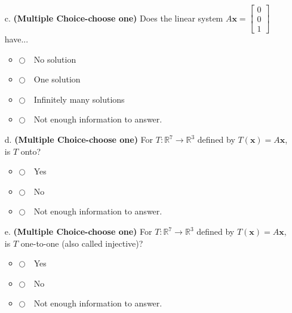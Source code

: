 \documentclass[12pt]{extarticle}
\newcommand{\chooseone}{{\Large$\Circle$\ \ }}
\begin{document}
\begin{enumerate}
\begin{itemize}
    \item[c.] \textbf{(Multiple Choice-choose one)}  Does the linear system $A\mathbf{x}=\begin{bmatrix} 0 \\0 \\1\end{bmatrix}$ have...
\begin{itemize}[label={}]
\item \chooseone No solution
\item \chooseone One solution
\item \chooseone Infinitely many solutions
\item \chooseone Not enough information to answer.
\end{itemize}  
     \vfill


     \item[d.] \textbf{(Multiple Choice-choose one)} For $T:\mathbb{R}^7\to\mathbb{R}^3$ defined by $T(\mathbf{x})=A\mathbf{x}$, is $T$ onto?
\begin{itemize}[label={}]
\item \chooseone Yes
\item \chooseone No
\item \chooseone Not enough information to answer.
\end{itemize}     
     
     \vfill


\item[e.] \textbf{(Multiple Choice-choose one)} For $T:\mathbb{R}^7\to\mathbb{R}^3$ defined by $T(\mathbf{x})=A\mathbf{x}$, is $T$ one-to-one (also called injective)?
\begin{itemize}[label={}]
\item \chooseone Yes
\item \chooseone No
\item \chooseone Not enough information to answer.
\end{itemize}   




\end{itemize}


    
    





    


\newpage


    


    

    
    
    
        \newpage
\end{enumerate}
\end{document}
